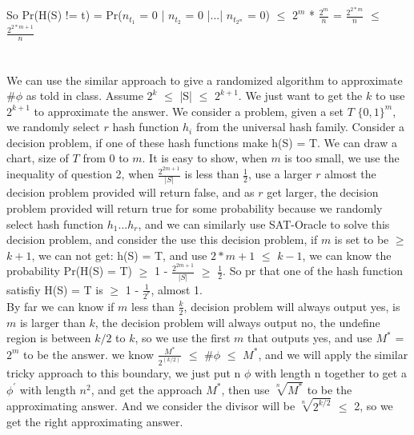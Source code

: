 \documentclass[11pt]{article}
\begin{document}
So Pr(H(S) != t) = Pr($n_{t_{1}}$ = 0 | $n_{t_{2}}$ = 0 |...| $n_{t_{2^{m}}}$ = 0) $\leq$ $2^{m}$ * $\frac{2^{m}}{n}$ = $\frac{2^{2*m}}{n}$ $\leq$ $\frac{2^{2*m+1}}{n}$


\part{}
We can use the similar approach to give a randomized algorithm to approximate \#$\phi$ as told in class. Assume $2^{k}$ $\leq$ |S| $\leq$ $2^{k+1}$. We just want to get the $k$ to use $2^{k+1}$ to approximate the answer. We consider a problem, given a set $T$ $\{0,1\}^{m}$, we randomly select $r$ hash function $h_{i}$ from the universal hash family. Consider a decision problem, if one of these hash functions make h(S) = T. We can draw a chart, size of $T$ from 0 to $m$. It is easy to show, when $m$ is too small, we use the inequality of question 2, when 
$\frac{2^{2m+1}}{|S|}$ is less than $\frac{1}{2}$, use a larger $r$ almost the decision problem provided will return false, and as $r$ get larger, the decision problem provided will return true for some probability because we randomly select hash function $h_{1}...h_{r}$, and we can similarly use SAT-Oracle to solve this decision problem, and consider the use this decision problem, if $m$ is set to be $\geq$ $k+1$, we can not get:  h(S) = T, and use $2*m+1$ $\leq$ $k-1$, we can know the probability Pr(H(S) = T) $\geq$ 1 - $\frac{2^{2m+1}}{|S|}$ $\geq$ $\frac{1}{2}$. So pr that one of the hash function satisfiy H(S) = T is $\geq$ 1 - $\frac{1}{2^{r}}$, almost 1. \\
By far we can know if $m$ less than $\frac{k}{2}$, decision problem will always output yes, is $m$ is larger than $k$, the decision problem will always output no, the undefine region is between $k/2$ to $k$, so we use the first $m$ that outputs yes, and use $M^{*}$ = $2^{m}$ to be the answer. we know $\frac{M^{*}}{2^(k/2)}$ $\leq$ \#$\phi$ $\leq$ $M^{*}$, and we will apply the similar tricky approach to this boundary, we just put n $\phi$ with length n together to get a $\phi^{'}$ with length $n^{2}$, and get the approach $M^{*}$, then use $\sqrt[n]{M^{*}}$ to be the approximating answer. And we consider the divisor will be $\sqrt[n]{2^{k/2}}$ $\leq$ 2, so we get the right approximating answer.
\end{document}
